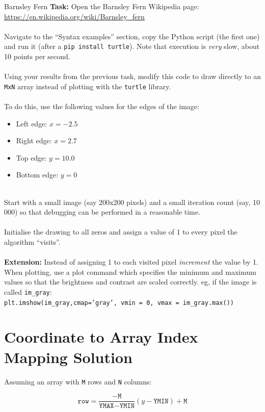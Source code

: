 \documentclass{lab}
\begin{document}
\begin{task}{Barnsley Fern}{}
\textbf{Task:} Open the Barnsley Fern Wikipedia page: \url{https://en.wikipedia.org/wiki/Barnsley_fern}
\\~\\
Navigate to the ``Syntax examples'' section, copy the Python script (the first one) and run it (after a \texttt{pip install turtle}). Note that execution is \textit{very} slow, about 10 points per second.
\\~\\
Using your results from the previous task, modify this code to draw directly to an \texttt{MxN} array instead of plotting with the \texttt{turtle} library.
\\~\\
To do this, use the following values for the edges of the image:
\\
\begin{itemize}
\item Left edge: $x=-2.5$
\item Right edge: $x=2.7$
\item Top edge: $y=10.0$
\item Bottom edge: $y=0$
\end{itemize}
~\\
Start with a small image (say 200x200 pixels) and a small iteration count (say, 10 000) so that debugging can be performed in a reasonable time.
\\~\\
Initialise the drawing to all zeros and assign a value of 1 to every pixel the algorithm ``visits''.
\\~\\
\textbf{Extension:} Instead of assigning 1 to each visited pixel \textit{increment} the value by 1. When plotting, use a plot command which specifies the minimum and maximum values so that the brightness and contrast are scaled correctly. eg, if the image is called \texttt{im\_gray}:\\ \texttt{plt.imshow(im\_gray,cmap='gray', vmin = 0, vmax = im\_gray.max())}
\end{task}

\section*{Coordinate to Array Index Mapping Solution}

Assuming an array with \texttt{M} rows and \texttt{N} columns:


\begin{equation}
\texttt{row} = \frac{-\texttt{M}}{\texttt{YMAX}-\texttt{YMIN}}(y-\texttt{YMIN}) + \texttt{M}
\end{equation}
\end{document}
